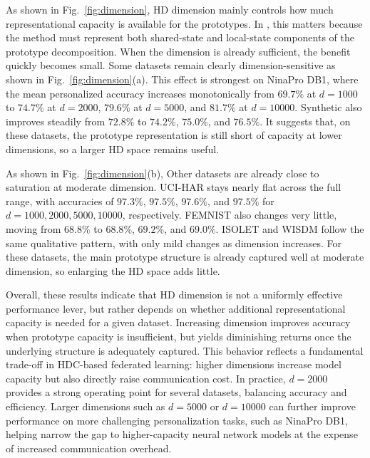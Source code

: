 \documentclass[lettersize,journal]{IEEEtran}
\newcommand{\rev}[1]{#1}
\begin{document}
As shown in Fig.~\ref{fig:dimension}, HD dimension mainly controls how much representational capacity is available for the prototypes.
In \Design, this matters because the method must represent both \rev{shared-state and local-state components} of the prototype decomposition.
When the dimension is already sufficient, the benefit quickly becomes small.
Some datasets remain clearly dimension-sensitive as shown in Fig.~\ref{fig:dimension}(a).
This effect is strongest on NinaPro DB1, where the mean personalized accuracy increases monotonically from \(69.7\%\) at \(d=1000\) to \(74.7\%\) at \(d=2000\), \(79.6\%\) at \(d=5000\), and \(81.7\%\) at \(d=10000\).
Synthetic also improves steadily from \(72.8\%\) to \(74.2\%\), \(75.0\%\), and \(76.5\%\).
It suggests that, on these datasets, the prototype representation is still short of capacity at lower dimensions, so a larger HD space remains useful.

As shown in Fig.~\ref{fig:dimension}(b), Other datasets are already close to saturation at moderate dimension.
UCI-HAR stays nearly flat across the full range, with accuracies of \(97.3\%\), \(97.5\%\), \(97.6\%\), and \(97.5\%\) for \(d=1000, 2000, 5000, 10000\), respectively.
FEMNIST also changes very little, moving from \(68.8\%\) to \(68.8\%\), \(69.2\%\), and \(69.0\%\).
ISOLET and WISDM follow the same qualitative pattern, with only mild changes as dimension increases.
For these datasets, the main prototype structure is already captured well at moderate dimension, so enlarging the HD space adds little.

Overall, these results indicate that HD dimension is not a uniformly effective performance lever, but rather depends on whether additional representational capacity is needed for a given dataset.
Increasing dimension improves accuracy when prototype capacity is insufficient, but yields diminishing returns once the underlying structure is adequately captured.
This behavior reflects a fundamental trade-off in HDC-based federated learning: higher dimensions increase model capacity but also directly raise communication cost.
In practice, \(d=2000\) provides a strong operating point for several datasets, balancing accuracy and efficiency.
Larger dimensions such as \(d=5000\) or \(d=10000\) can further improve performance on more challenging personalization tasks, such as NinaPro DB1, helping narrow the gap to higher-capacity neural network models at the expense of increased communication overhead.
\end{document}
